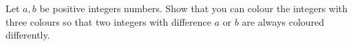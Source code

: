 Let $a,b$ be positive integers numbers. Show that you can colour the integers with three
colours so that two integers with difference $a$ or $b$ are always coloured differently. 